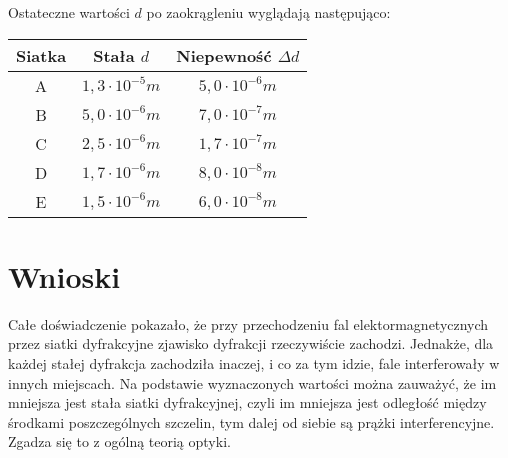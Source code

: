 \documentclass[10pt,a4paper]{article}
\begin{document}
Ostateczne wartości $d$ po zaokrągleniu wyglądają następująco:

\begin{center}
\begin{tabular}{|c|c|c|}
\hline
Siatka & Stała $d$ & Niepewność $\Delta d$\\
\hline
A & $1,3 \cdot 10^{-5} m$ & $5,0 \cdot 10^{-6} m$\\
\hline
B & $5,0 \cdot 10^{-6} m$ & $7,0 \cdot 10^{-7} m$ \\
\hline
C & $2,5 \cdot 10^{-6} m$ & $1,7 \cdot 10^{-7} m$\\
\hline
D & $1,7 \cdot 10^{-6} m$ & $8,0 \cdot 10^{-8} m$\\
\hline
E & $1,5 \cdot 10^{-6} m$ & $6,0 \cdot 10^{-8} m$\\
\hline
\end{tabular}
\end{center}

\section*{Wnioski}

Całe doświadczenie pokazało, że przy przechodzeniu fal elektormagnetycznych przez siatki dyfrakcyjne zjawisko dyfrakcji rzeczywiście zachodzi. Jednakże, dla każdej stałej dyfrakcja zachodziła inaczej, i co za tym idzie, fale interferowały w innych miejscach. Na podstawie wyznaczonych wartości można zauważyć, że im mniejsza jest stała siatki dyfrakcyjnej, czyli im mniejsza jest odległość między środkami poszczególnych szczelin, tym dalej od siebie są prążki interferencyjne. Zgadza się to z ogólną teorią optyki. 
\end{document}
